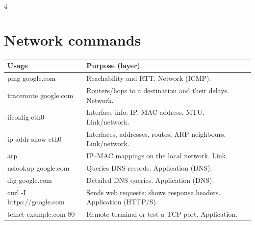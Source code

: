 \documentclass[10pt]{extarticle}
\begin{document}
\begin{multicols}{4}
\section{Network commands}
\begingroup\scriptsize\setlength{\tabcolsep}{2pt}\renewcommand{\arraystretch}{1.02}
\noindent
\begin{tabularx}{\linewidth}{@{}>{\ttfamily\raggedright\arraybackslash}p{.40\linewidth}>{\raggedright\arraybackslash}X@{}}
\toprule
\normalfont\textbf{Usage} & \textbf{Purpose (layer)} \\
\midrule
\rowcolor{gray!12} ping google.com & Reachability and RTT. Network (ICMP). \\
traceroute google.com & Routers/hops to a destination and their delays. Network. \\
\rowcolor{gray!12} ifconfig eth0 & Interface info: IP, MAC address, MTU. Link/network. \\
ip addr show eth0 & Interfaces, addresses, routes, ARP neighbours. Link/network. \\
\rowcolor{gray!12} arp & IP--MAC mappings on the local network. Link. \\
nslookup google.com & Queries DNS records. Application (DNS). \\
\rowcolor{gray!12} dig google.com & Detailed DNS queries. Application (DNS). \\
curl -I https://google.com & Sends web requests; shows response headers. Application (HTTP/S). \\
\rowcolor{gray!12} telnet example.com 80 & Remote terminal or test a TCP port. Application. \\
\bottomrule
\end{tabularx}\par\endgroup

\end{multicols}
\end{document}
